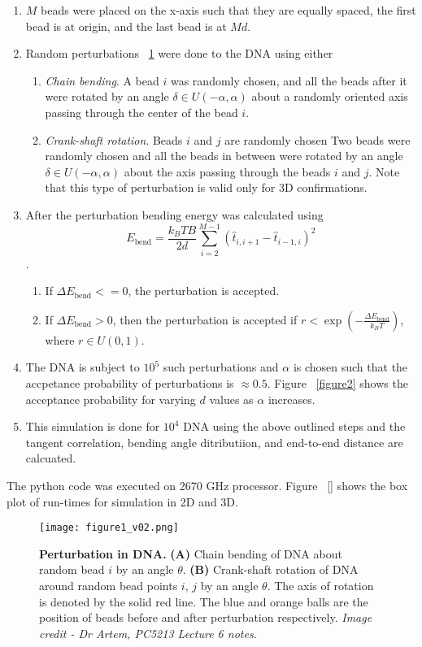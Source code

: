 \documentclass{scrartcl}
\begin{document}
\begin{enumerate}
\item $M$ beads were placed on the x-axis such that they are equally spaced, the first bead is at origin, and the last bead is at $Md$.
\item Random perturbations ~\ref{figure1} were done to the DNA using either
	\begin{enumerate}
	\item \textit{Chain bending}. A bead $i$ was randomly chosen, and all the beads after it were rotated by an angle $\delta \in U(-\alpha,\alpha)$ about a randomly oriented axis passing through the center of the bead $i$. 
	\item \textit{Crank-shaft rotation}. Beads $i$ and $j$ are randomly chosen Two beads were randomly chosen and all the beads in between were  rotated by an angle $\delta \in U(-\alpha,\alpha)$ about the axis passing through the beads $i$ and $j$. Note that this type of perturbation is valid only for 3D confirmations.
	\end{enumerate}
\item After the perturbation bending energy was calculated using $$E_{\textrm{bend}} = \frac{k_B T B}{2 d} \sum_{i=2}^{M-1} \left( \hat{t}_{i,i+1} - \hat{t}_{i-1,i} \right)^2$$.
	\begin{enumerate}
	\item If $\Delta E_{\textrm{bend}} <= 0$, the perturbation is accepted.
	\item If $\Delta E_{\textrm{bend}} > 0$, then the perturbation is accepted if $r < \exp \left( -\frac{\Delta E_{\textrm{bend}}}{k_B T} \right)$, where $r \in U(0,1)$.
	\end{enumerate}
\item The DNA is subject to $10^5$ such perturbations and $\alpha$ is chosen such that the accpetance probability of perturbations is $\approx 0.5$. Figure ~\ref{figure2} shows the acceptance probability for varying $d$ values as $\alpha$ increases.
\item This simulation is done for $10^4$ DNA using the above outlined steps and the tangent correlation, bending angle ditributiion, and end-to-end distance are calcuated.
\end{enumerate}

The python code was executed on  2670 GHz processor. Figure ~\ref{} shows the box plot of run-times for simulation in 2D and 3D.

\begin{figure}
\label{figure1}
\centering
\texttt{[image: figure1\_v02.png]}
\caption{\textbf{Perturbation in DNA.} \textbf{(A)} Chain bending of DNA about random bead $i$ by an angle $\theta$. \textbf{(B)} Crank-shaft rotation of DNA around random bead points $i$, $j$ by an angle $\theta$. The axis of rotation is denoted by the solid red line. The blue and orange balls are the position of beads before and after perturbation respectively. \textit{Image credit - Dr Artem, PC5213 Lecture 6 notes.}}
\end{figure}
\end{document}
